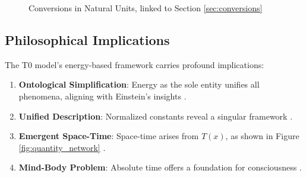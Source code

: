 \documentclass[12pt,a4paper]{article}
\newcommand{\Tfield}{T(x)}
\begin{document}
	\begin{figure}[htbp]
		\centering
		\caption{Conversions in Natural Units, linked to Section \ref{sec:conversions}}
		\label{fig:practical_conversion}
	\end{figure}
	
	\subsection{Philosophical Implications}
	\label{sec:philosophy}
	
	The T0 model’s energy-based framework carries profound implications:
	\begin{enumerate}
		\item \textbf{Ontological Simplification}: Energy as the sole entity unifies all phenomena, aligning with Einstein’s insights \cite{Einstein1905, pascher_dualismus_2025}.
		\item \textbf{Unified Description}: Normalized constants reveal a singular framework \cite{pascher_vereinheitlichung_2025}.
		\item \textbf{Emergent Space-Time}: Space-time arises from \(\Tfield\), as shown in Figure \ref{fig:quantity_network} \cite{pascher_perspective_2025}.
		\item \textbf{Mind-Body Problem}: Absolute time offers a foundation for consciousness \cite{pascher_perspective_2025}.
	\end{enumerate}
	
\end{document}
